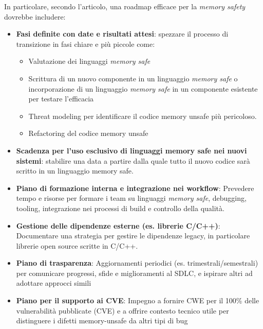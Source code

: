In particolare, secondo l'articolo, una roadmap efficace per la \textit{memory
safety} dovrebbe includere:

\begin{itemize}
  \item \textbf{Fasi definite con date e risultati attesi}: spezzare il processo
    di transizione in fasi chiare e più piccole come:
    \begin{itemize}
      \item Valutazione dei linguaggi \textit{memory safe}

      \item Scrittura di un nuovo componente in un linguaggio \textit{memory
        safe} o incorporazione di un linguaggio \textit{memory safe} in un componente
        esistente per testare l'efficacia

      \item Threat modeling per identificare il codice memory unsafe più pericoloso.

      \item Refactoring del codice memory unsafe
    \end{itemize}

  \item \textbf{Scadenza per l'uso esclusivo di linguaggi memory safe nei nuovi
    sistemi}: stabilire una data a partire dalla quale tutto il nuovo codice sarà
    scritto in un linguaggio memory safe.

  \item \textbf{Piano di formazione interna e integrazione nei workflow}: Prevedere
    tempo e risorse per formare i team su linguaggi \textit{memory safe}, debugging,
    tooling, integrazione nei processi di build e controllo della qualità.

  \item \textbf{Gestione delle dipendenze esterne (es. librerie C/C++)}: Documentare
    una strategia per gestire le dipendenze legacy, in particolare librerie open
    source scritte in C/C++.

  \item \textbf{Piano di trasparenza}: Aggiornamenti periodici (es. trimestrali/semestrali)
    per comunicare progressi, sfide e miglioramenti al SDLC, e ispirare altri ad
    adottare approcci simili

  \item \textbf{Piano per il supporto ai CVE}: Impegno a fornire CWE per il 100\%
    delle vulnerabilità pubblicate (CVE) e a offrire contesto tecnico utile per
    distinguere i difetti memory-unsafe da altri tipi di bug
\end{itemize}

